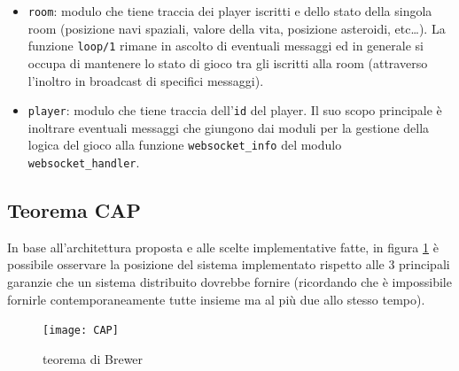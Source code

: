 \documentclass[paper=a4, fontsize=11pt]{scrartcl} %
\numberwithin{equation}{section} %
\numberwithin{figure}{section} %
\numberwithin{table}{section} %
\begin{document}
\begin{itemize}
\item \texttt{room}: modulo che tiene traccia dei player iscritti e dello stato della singola room (posizione navi spaziali, valore della vita, posizione asteroidi, etc\dots).
La funzione \texttt{loop/1} rimane in ascolto di eventuali messaggi ed in generale si occupa di mantenere lo stato di gioco tra gli iscritti alla room (attraverso l'inoltro in broadcast di specifici messaggi).
\item \texttt{player}: modulo che tiene traccia dell'\texttt{id} del player. Il suo scopo principale è inoltrare eventuali messaggi che giungono dai moduli per la gestione della logica del gioco alla funzione \texttt{websocket\_info} del modulo \texttt{websocket\_handler}.
\end{itemize}

\subsection{Teorema CAP}
In base all'architettura proposta e alle scelte implementative fatte, in figura \ref{CAP} è possibile osservare la posizione del sistema implementato rispetto alle 3 principali garanzie che un sistema distribuito dovrebbe fornire (ricordando che è impossibile fornirle contemporaneamente tutte insieme ma al più due allo stesso tempo).
\begin{figure}
\centering
\texttt{[image: CAP]}
\caption{teorema di Brewer}
\label{CAP}
\end{figure}
\end{document}

